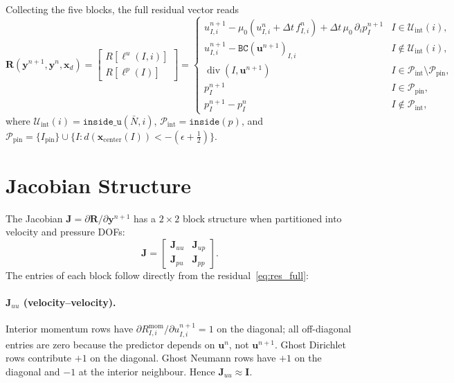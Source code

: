 \documentclass[11pt]{article}
\newcommand{\vect}[1]{\bm{#1}}
\newcommand{\pp}{\partial}
\begin{document}
Collecting the five blocks, the full residual vector reads
\begin{equation}\label{eq:res_full}
  \vect{R}(\vect{y}^{n+1},\vect{y}^{n},\vect{x}_d) =
  \begin{bmatrix}
    R[\ell^{u}(I,i)] \\[6pt] R[\ell^{p}(I)]
  \end{bmatrix}
  =
  \begin{cases}
    u^{n+1}_{I,i} - \mu_0(u^n_{I,i}+\Delta t\,f^n_{I,i})
      + \Delta t\,\mu_0\,\partial_i p^{n+1}_I
      & I\in\mathcal{U}_{\mathrm{int}}(i), \\[4pt]
    u^{n+1}_{I,i} - \texttt{BC}(\vect{u}^{n+1})_{I,i}
      & I\notin\mathcal{U}_{\mathrm{int}}(i), \\[8pt]
    \operatorname{div}(I,\vect{u}^{n+1})
      & I\in\mathcal{P}_{\mathrm{int}}\setminus\mathcal{P}_{\mathrm{pin}}, \\[4pt]
    p^{n+1}_I
      & I\in\mathcal{P}_{\mathrm{pin}}, \\[4pt]
    p^{n+1}_I - p^{n}_I
      & I\notin\mathcal{P}_{\mathrm{int}},
  \end{cases}
\end{equation}
where
$\mathcal{U}_{\mathrm{int}}(i) = \texttt{inside\_u}(\bar N,i)$,\;
$\mathcal{P}_{\mathrm{int}} = \texttt{inside}(p)$,\;
and
$\mathcal{P}_{\mathrm{pin}} = \{I_{\mathrm{pin}}\}
  \cup \{I : d(\vect{x}_{\mathrm{center}}(I)) < -(\epsilon+\tfrac{1}{2})\}$.

\section{Jacobian Structure}
\label{sec:jacobian}

The Jacobian $\vect{J} = \pp\vect{R}/\pp\vect{y}^{n+1}$ has a
$2\times2$ block structure when partitioned into velocity and pressure DOFs:
\begin{equation}\label{eq:jacobian}
  \vect{J} =
  \begin{bmatrix}
    \vect{J}_{uu} & \vect{J}_{up} \\[4pt]
    \vect{J}_{pu} & \vect{J}_{pp}
  \end{bmatrix}.
\end{equation}
The entries of each block follow directly from the
residual~\eqref{eq:res_full}:

\paragraph{$\vect{J}_{uu}$ (velocity--velocity).}
Interior momentum rows have
$\pp R^{\mathrm{mom}}_{I,i}/\pp u^{n+1}_{I,i} = 1$ on the diagonal;
all off-diagonal entries are zero because the predictor depends on
$\vect{u}^n$, not $\vect{u}^{n+1}$.
Ghost Dirichlet rows contribute $+1$ on the diagonal.
Ghost Neumann rows have $+1$ on the diagonal and $-1$ at the interior
neighbour.  Hence $\vect{J}_{uu}\approx\vect{I}$.
\end{document}
